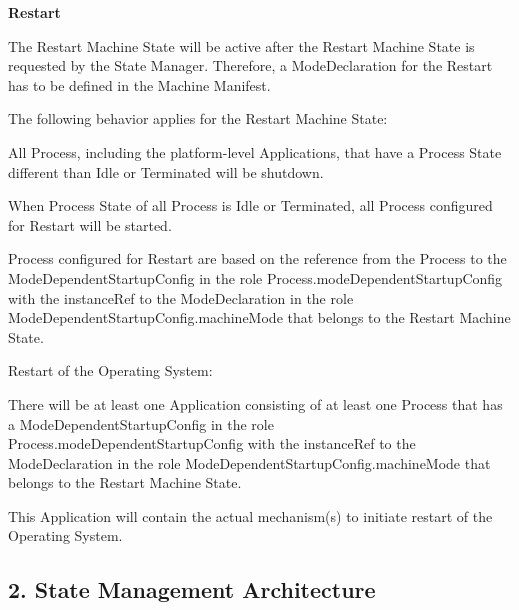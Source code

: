 \begin{DoxyItemize}
\begin{DoxyItemize}
\end{DoxyItemize}
\item {\bfseries Restart}
\begin{DoxyItemize}
\item The Restart Machine State will be active after the Restart Machine State is requested by the State Manager. Therefore, a Mode\+Declaration for the Restart has to be defined in the Machine Manifest.
\item The following behavior applies for the Restart Machine State\+:
\begin{DoxyItemize}
\item All Process, including the platform-\/level Applications, that have a Process State different than Idle or Terminated will be shutdown.
\item When Process State of all Process is Idle or Terminated, all Process configured for Restart will be started.
\item Process configured for Restart are based on the reference from the Process to the Mode\+Dependent\+Startup\+Config in the role Process.\+mode\+Dependent\+Startup\+Config with the instance\+Ref to the Mode\+Declaration in the role Mode\+Dependent\+Startup\+Config.\+machine\+Mode that belongs to the Restart Machine State.
\end{DoxyItemize}
\item Restart of the Operating System\+:
\begin{DoxyItemize}
\item There will be at least one Application consisting of at least one Process that has a Mode\+Dependent\+Startup\+Config in the role Process.\+mode\+Dependent\+Startup\+Config with the instance\+Ref to the Mode\+Declaration in the role Mode\+Dependent\+Startup\+Config.\+machine\+Mode that belongs to the Restart Machine State.
\item This Application will contain the actual mechanism(s) to initiate restart of the Operating System.
\end{DoxyItemize}
\end{DoxyItemize}
\end{DoxyItemize}

\subsection*{2. {\bfseries State Management Architecture}}


